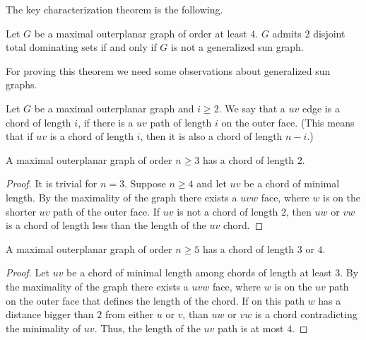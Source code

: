 The key characterization theorem is the following.

\begin{thm}\label{thm:outerplanar}
  Let $G$ be a maximal outerplanar graph of order at least $4$. $G$ admits $2$ disjoint total dominating
  sets if and only if $G$ is not a generalized sun graph.
\end{thm}

For proving this theorem we need some observations about generalized sun graphs.

\begin{definition}
  Let $G$ be a maximal outerplanar graph and $i \ge 2$. We say that a $uv$ edge is a chord
  of length $i$, if there is a $uv$ path of length $i$ on the outer face. (This means
  that if $uv$ is a chord of length $i$, then it is also a chord of length $n - i$.)
\end{definition}

\begin{lemma} \label{lem:two_chord}
  A maximal outerplanar graph of order $n \ge 3$ has a chord of length $2$.
\end{lemma}
\begin{proof}
  It is trivial for $n = 3$. Suppose $n \ge 4$ and
  let $uv$ be a chord of minimal length. By
  the maximality of the graph there exists a $uvw$ face, where $w$ is on the shorter
  $uv$ path of the outer face. If $uv$ is not a chord of length $2$, then $uw$ or $vw$
  is a chord of length less than the length of the $uv$ chord.
\end{proof}

\begin{lemma} \label{lem:3-4_chord}
  A maximal outerplanar graph of order $n \ge 5$ has a chord of length $3$ or $4$.
\end{lemma}
\begin{proof}
  Let $uv$ be a chord of minimal length among chords of length at least $3$. By
  the maximality of the graph there exists a $uvw$ face, where $w$ is on the $uv$ path
  on the outer face that defines the length of the chord. If on this path $w$ has a distance
  bigger than $2$ from either $u$ or $v$, than $uw$ or $vw$ is a chord contradicting
  the minimality of $uv$. Thus, the length of the $uv$ path is at most $4$.
\end{proof}

